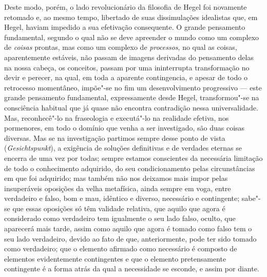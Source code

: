 Deste modo, porém, o lado revolucionário da filosofia
de Hegel foi
novamente retomado e, ao mesmo tempo, libertado de suas dissimulações
idealistas que,
em Hegel,
haviam impedido a sua efetivação consequente. O grande pensamento
fundamental, segundo o qual não se deve apreender o mundo como um
complexo de \emph{coisas }prontas, mas como um complexo
de \emph{processos}, no qual as coisas, aparentemente estáveis, não
passam de imagens derivadas do pensamento delas na nossa cabeça, os
conceitos, passam por uma ininterrupta transformação no devir e perecer,
na qual, em toda a aparente contingencia, e apesar de todo o retrocesso
momentâneo, impõe"-se no fim um desenvolvimento progressivo --- este grande
pensamento fundamental, expressamente
desde Hegel,
transformou"-se na consciência habitual que já quase não encontra
contradição nessa universalidade. Mas, reconhecê"-lo na fraseologia e
executá"-lo na realidade efetiva, nos pormenores, em todo o domínio que
venha a ser investigado, são duas coisas diversas. Mas se na
investigação partimos sempre desse ponto de vista
(\emph{Gesichtspunkt}), a exigência de soluções definitivas e de
verdades eternas se encerra de uma vez por todas; sempre estamos
conscientes da necessária limitação de todo o conhecimento adquirido, do
seu condicionamento pelas circunstâncias em que foi adquirido; mas
também não nos deixamos mais impor pelas insuperáveis oposições da velha
metafísica, ainda sempre em voga, entre verdadeiro e falso, bom e mau,
idêntico e diverso, necessário e contingente; sabe"-se que essas
oposições só têm validade relativa, que aquilo que agora é considerado
como verdadeiro tem igualmente o seu lado falso, oculto, que aparecerá
mais tarde, assim como aquilo que agora é tomado como falso tem o seu
lado verdadeiro, devido ao fato de que, anteriormente, pode ter sido
tomado como verdadeiro; que o elemento afirmado como necessário é
composto de elementos evidentemente contingentes e que o elemento
pretensamente contingente é a forma atrás da qual a necessidade se
esconde, e assim por diante.


